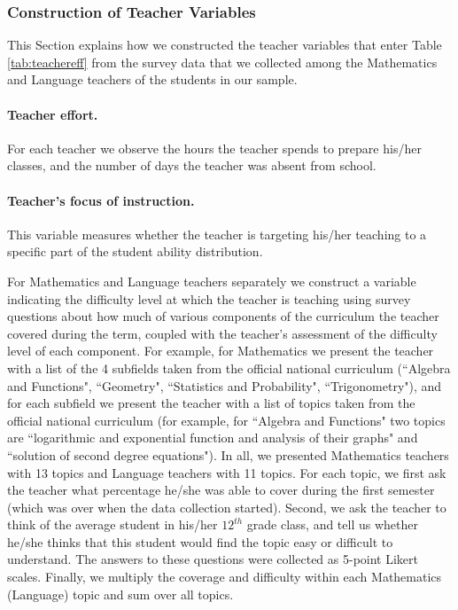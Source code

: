	\subsubsection{Construction of Teacher Variables}\label{sec:teachervar}
		This Section explains how we constructed the teacher variables that enter Table \ref{tab:teachereff} from the survey data that we collected among the Mathematics and Language teachers of the students in our sample.  \par
  
		
		\paragraph{Teacher effort.} For each teacher we observe the hours the teacher spends to prepare his/her classes, and the number of days the teacher was absent from school.\par
		
		\paragraph{Teacher's focus of instruction.} This variable measures whether the teacher is targeting his/her teaching to a specific part of the student ability distribution.\par
	
		For Mathematics and Language teachers separately we  construct a variable indicating the difficulty level at which the teacher is teaching using survey questions about how much of various components of the curriculum the teacher covered during the term, coupled with the teacher's assessment of the difficulty level of each component. For example, for Mathematics we present the teacher with a list of the 4 subfields taken from the official national curriculum (``Algebra and Functions", ``Geometry", ``Statistics and Probability", ``Trigonometry"), and for each subfield we present the teacher with a list of topics taken from the official national curriculum (for example, for ``Algebra and Functions" two topics are ``logarithmic and exponential function and analysis of their graphs" and ``solution of second degree equations"). In all, we presented Mathematics teachers with 13 topics and Language teachers with 11 topics. For each topic, we first ask the teacher what percentage he/she was able to cover during the first semester (which was over when the data collection started). Second, we ask the teacher to think of the average student in his/her $12^{th}$ grade class, and tell us whether he/she thinks that this student would find the topic easy or difficult to understand. The answers to these questions were collected as 5-point Likert scales. Finally, we multiply the coverage and difficulty within each Mathematics (Language) topic and sum over all topics. 
	